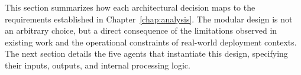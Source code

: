 This section summarizes how each architectural decision maps to the requirements established in Chapter~\ref{chap:analysis}. The modular design is not an arbitrary choice, but a direct consequence of the limitations observed in existing work and the operational constraints of real-world deployment contexts. The next section details the five agents that instantiate this design, specifying their inputs, outputs, and internal processing logic.